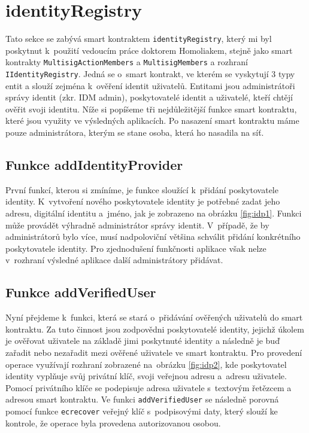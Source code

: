 \section{identityRegistry}
\label{identityRegistry}
Tato sekce se zabývá smart kontraktem \texttt{identityRegistry}, který mi byl poskytnut k~použití vedoucím práce doktorem Homoliakem, stejně jako smart kontrakty \texttt{MultisigAction\-Members} a \texttt{MultisigMembers} a rozhraní \texttt{IIdentityRegistry}. Jedná se o~smart kontrakt, ve kterém se vyskytují 3 typy entit a slouží zejména k~ověření identit uživatelů. Entitami jsou administrátoři správy identit (zkr. IDM admin), poskytovatelé identit a uživatelé, kteří chtějí ověřit svoji identitu. Níže si popíšeme tři nejdůležitější funkce smart kontraktu, které jsou využity ve výsledných aplikacích. Po nasazení smart kontraktu máme pouze administrátora, kterým se stane osoba, která ho nasadila na síť. 

\subsection{Funkce addIdentityProvider}
První funkcí, kterou si zmíníme, je funkce sloužící k~přidání poskytovatele identity. K~vytvoření nového poskytovatele identity je potřebné zadat jeho adresu, digitální identitu a~jméno, jak je zobrazeno na obrázku \ref{fig:idp1}. Funkci může provádět výhradně administrátor správy identit. V~případě, že by administrátorů bylo více, musí nadpoloviční většina schválit přidání konkrétního poskytovatele identity. Pro zjednodušení funkčnosti aplikace však nelze v~rozhraní výsledné aplikace další administrátory přidávat. 

\subsection{Funkce addVerifiedUser}
Nyní přejdeme k~funkci, která se stará o~přidávání ověřených uživatelů do smart kontraktu. Za tuto činnost jsou zodpovědni poskytovatelé identity, jejichž úkolem je ověřovat uživatele na základě jimi poskytnuté identity a následně je buď zařadit nebo nezařadit mezi ověřené uživatele ve smart kontraktu. Pro provedení operace využívají rozhraní zobrazené na~obrázku \ref{fig:idp2}, kde poskytovatel identity vyplňuje svůj privátní klíč, svoji veřejnou adresu a~adresu uživatele. Pomocí privátního klíče se podepisuje adresa uživatele s~textovým řetězcem a adresou smart kontraktu. Ve funkci \texttt{addVerifiedUser} se následně porovná pomocí funkce \texttt{ecrecover} veřejný klíč s~podpisovými daty, který slouží ke kontrole, že operace byla provedena autorizovanou osobou. 

